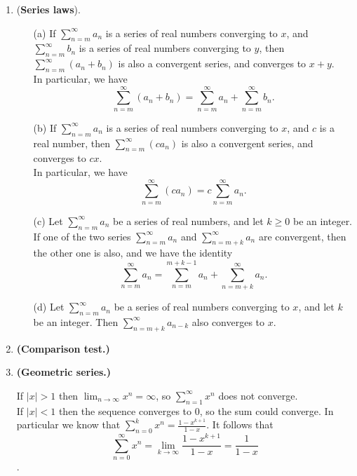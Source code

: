\documentclass{article}
\theoremstyle{remark}
\begin{document}
\begin{enumerate}
    \item (\textbf{Series laws}).
    \begin{enumerate}
        \item[(a)] If \( \sum_{n=m}^{\infty} a_n \) is a series of real numbers converging to \( x \), and
        \( \sum_{n=m}^{\infty} b_n \) is a series of real numbers converging to \( y \), then
        \( \sum_{n=m}^{\infty} (a_n + b_n) \) is also a convergent series, and converges to \( x + y \).\\
        In particular, we have
        \[
        \sum_{n=m}^{\infty} (a_n + b_n)
        = \sum_{n=m}^{\infty} a_n + \sum_{n=m}^{\infty} b_n.
        \]

        \item[(b)] If \( \sum_{n=m}^{\infty} a_n \) is a series of real numbers converging to \( x \), and
        \( c \) is a real number, then \( \sum_{n=m}^{\infty} (c a_n) \) is also a convergent series, and
        converges to \( cx \).\\
        In particular, we have
        \[
        \sum_{n=m}^{\infty} (c a_n)
        = c \sum_{n=m}^{\infty} a_n.
        \]

        \item[(c)] Let \( \sum_{n=m}^{\infty} a_n \) be a series of real numbers, and let
        \( k \geq 0 \) be an integer. If one of the two series
        \( \sum_{n=m}^{\infty} a_n \) and \( \sum_{n=m+k}^{\infty} a_n \) are convergent,
        then the other one is also, and we have the identity
        \[
            \sum_{n=m}^{\infty} a_n
            = \sum_{n=m}^{m+k-1} a_n + \sum_{n=m+k}^{\infty} a_n.
        \]

        \item[(d)] Let \( \sum_{n=m}^{\infty} a_n \) be a series of real numbers converging to \( x \),
        and let \( k \) be an integer. Then
        \( \sum_{n=m+k}^{\infty} a_{n-k} \) also converges to \( x \).
    \end{enumerate}

    \item \textbf{(Comparison test.)}

    \item \textbf{(Geometric series.)}
    
    If $|x| > 1$ then $\lim_{n\to\infty} x^n = \infty$, so $\sum_{n=1}^{\infty} x^n$ does not converge. \\
    If $|x| < 1$ then the sequence converges to 0, so the sum could converge. In particular we know that $\sum_{n=0}^{k} x^n = \frac{1 - x^{k+1}}{1 - x}$. It follows that \[\sum_{n=0}^{\infty} x^n = \lim_{k\to\infty} \frac{1 - x^{k+1}}{1 - x}=\frac{1}{1-x}\].
    

\end{enumerate}
\end{document}
